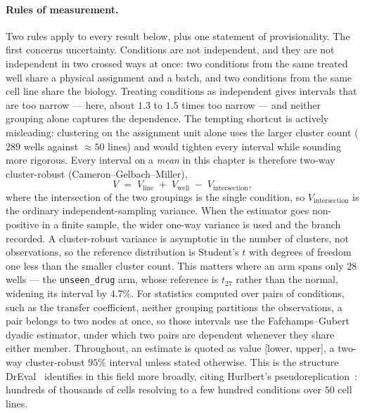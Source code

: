 \paragraph{Rules of measurement.} Two rules apply to every result below, plus one statement of
provisionality. The first concerns uncertainty. Conditions are not independent, and they are not
independent in two crossed ways at once: two conditions from the same treated well share a physical
assignment and a batch, and two conditions from the same cell line share the biology. Treating
conditions as independent gives intervals that are too narrow --- here, about $1.3$ to $1.5$ times
too narrow --- and neither grouping alone captures the dependence. The tempting shortcut is actively
misleading: clustering on the assignment unit alone uses the larger cluster count ($289$ wells
against $\approx 50$ lines) and would tighten every interval while sounding more rigorous. Every interval on a
\emph{mean} in this chapter is therefore two-way cluster-robust (Cameron--Gelbach--Miller),
\begin{equation}
 V \;=\; V_{\textrm{line}} \;+\; V_{\textrm{well}} \;-\; V_{\textrm{intersection}},
\end{equation}
where the intersection of the two groupings is the single condition, so $V_{\textrm{intersection}}$
is the ordinary independent-sampling variance. When the estimator goes non-positive in a finite
sample, the wider one-way variance is used and the branch recorded. A cluster-robust variance is
asymptotic in the number of clusters, not observations, so the reference distribution is Student's
$t$ with degrees of freedom one less than the smaller cluster count. This matters where an arm spans
only $28$ wells --- the \texttt{unseen\_drug} arm, whose reference is $t_{27}$ rather than the
normal, widening its interval by $4.7\%$. For statistics
computed over pairs of conditions, such as the transfer coefficient, neither grouping partitions the
observations, a pair belongs to two nodes at once, so those intervals use the
Fafchamps--Gubert dyadic estimator, under which two pairs are dependent whenever they share either
member. Throughout, an estimate is quoted as value [lower, upper], a two-way cluster-robust $95\%$
interval unless stated otherwise. This is the structure DrEval~\cite{dreval} identifies in this
field more broadly, citing Hurlbert's pseudoreplication~\cite{hurlbert}: hundreds of thousands of
cells resolving to a few hundred conditions over $50$ cell lines.

